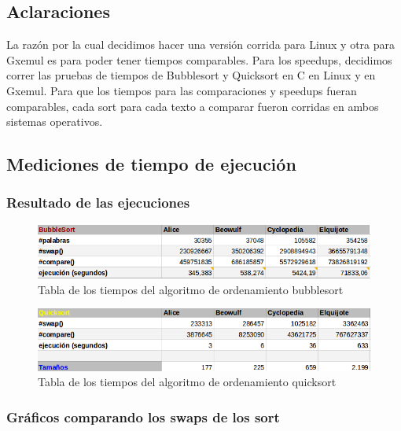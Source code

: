 \documentclass[a4paper,10pt]{article}
\begin{document}
\bigskip
\subsection{Aclaraciones}
La raz\'on por la cual decidimos hacer una versi\'on corrida para Linux y otra para Gxemul es para poder tener tiempos comparables. Para los speedups, decidimos correr las pruebas de tiempos de Bubblesort y Quicksort en C en Linux y en Gxemul. Para que los tiempos para las comparaciones y speedups fueran comparables, cada sort para cada texto a comparar fueron corridas en ambos sistemas operativos.



\newpage
\subsection{Mediciones de tiempo de ejecuci\'on}
\subsubsection{Resultado de las ejecuciones}

\begin{figure}[h!]
	\centering
	\includegraphics[scale=0.7]{./recursos/bubblesort.png}
	\caption{Tabla de los tiempos del algoritmo de ordenamiento bubblesort}
\end{figure}

\begin{figure}[h!]
	\centering
	\includegraphics[scale=0.7]{./recursos/quicksort.png}
	\caption{Tabla de los tiempos del algoritmo de ordenamiento quicksort}
\end{figure}


\subsubsection{Gr\'aficos comparando los swaps de los sort}
\end{document}
